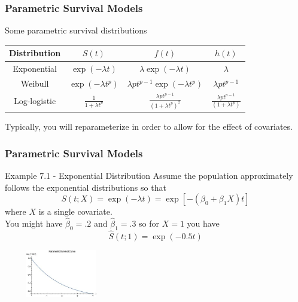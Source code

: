 \documentclass{beamer}
\theoremstyle{definition}
\begin{document}
\begin{frame}
\frametitle{Parametric Survival Models}
\begin{block}{Some parametric survival distributions}
\begin{center}
\begin{tabular}{ c c c c }
Distribution & $S(t)$ & $f(t)$ & $h(t)$  \\    \hline
Exponential  & $\exp(-\lambda t)$  & $\lambda \exp(-\lambda t)$ & $\lambda$    \\
Weibull      & $\exp(-\lambda t^p)$ & $ \lambda p t^{p-1} \exp(-\lambda t^p)$ & $\lambda p  t^{p-1}$  \\
Log-logistic & $\frac{1}{1 + \lambda t^p}$ & $\frac{\lambda p t^{p-1}}{(1+\lambda t^p)^2}$ & $\frac{\lambda p t^{p-1}}{(1+\lambda t^p)}$ \\ \hline
\end{tabular}
\end{center}
\end{block}
Typically, you will reparameterize in order to allow for the effect of covariates.
\end{frame}


\begin{frame}
\frametitle{Parametric Survival Models}
\begin{block}{Example 7.1 - Exponential Distribution}
Assume the population approximately follows the exponential distributions so that
\[
S(t;X) = \exp(-\lambda t) = \exp[-(\beta_0 + \beta_1 X)t]
\]
where $X$ is a single covariate. \\

You might have $\hat{\beta}_0=.2$ and $\hat{\beta}_1=.3$ so for $X=1$ you have
\[
\hat{S}(t;1) = \exp(-0.5 t)
\]
\begin{center}
        \includegraphics[width=5cm, height=2.1cm]{CH7_ex1.JPG}
    \end{center}
\end{block}
\end{frame}
\end{document}
